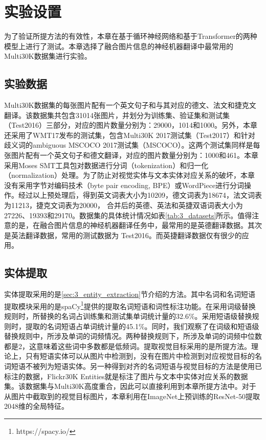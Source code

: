 \section{实验设置}
为了验证所提方法的有效性，本章在基于循环神经网络和基于Transformer的两种模型上进行了测试。本章选择了融合图片信息的神经机器翻译中最常用的Multi30K数据集进行实验。

\subsection{实验数据}

Multi30K数据集的每张图片配有一个英文句子和与其对应的德文、法文和捷克文翻译。该数据集共包含31014张图片，并划分为训练集、验证集和测试集（Test2016）三部分，对应的图片数量分别为：29000，1014和1000。另外，本章还采用了WMT17发布的测试集，包含Multi30K 2017测试集（Test2017）和针对歧义词的ambiguous MSCOCO 2017测试集（MSCOCO）。这两个测试集同样是每张图片配有一个英文句子和德文翻译，对应的图片数量分别为：1000和461。本章采用Moses SMT工具包对数据进行分词（tokenization）和归一化（normalization）处理。为了防止对视觉实体与文本实体对应关系的破坏，本章没有采用字节对编码技术（byte pair encoding, BPE）或WordPiece进行分词操作。经过以上预处理后，得到英文词表大小为10209，德文词表为18674，法文词表为11213，捷克文词表为20000， 合并后的英德、英法和英捷双语词表大小为27226、19393和29170。数据集的具体统计情况如表\ref{tab:3_datasets}所示。值得注意的是，在融合图片信息的神经机器翻译任务中，最常用的是英德翻译数据。其次是英法翻译数据，常用的测试数据为 Test2016。而英捷翻译数据仅有很少的应用。

\subsection{实体提取}
\label{sec:3_setup_entity_extraction}
实体提取采用的是\ref{sec:3_entity_extraction}节介绍的方法。其中名词和名词短语提取模块采用的是spaCy\footnote{https://spacy.io/}提供的提取名词短语和词性标注功能。在采用词级替换规则时，所替换的名词占训练集和测试集单词统计量的32.6\%。采用短语级替换规则时，提取的名词短语占单词统计量的45.1\%。同时，我们观察了在词级和短语级替换规则中，所涉及单词的词频情况。两种替换规则下，所涉及单词的词频中位数都是2，这意味着这些词中多数都是低频词。提取视觉目标采用的是所提方法。理论上，只有短语实体可以从图片中检测到，没有在图片中检测到对应视觉目标的名词短语不被列为短语实体。另一种得到对齐的名词短语与视觉目标的方法是使用已标注的数据，Flickr30K Entities就是标注了图片与文本中实体对应关系的数据集。该数据集与Multi30K高度重合，因此可以直接利用到本章所提方法中。对于从图片中截取到的视觉目标图片，本章利用在ImageNet上预训练的ResNet-50提取2048维的全局特征。

